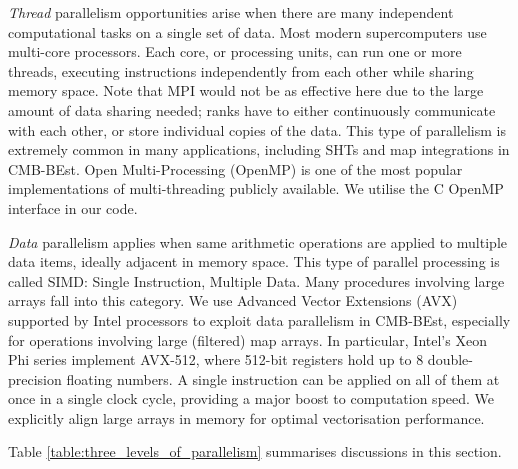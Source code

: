 \textit{Thread} parallelism opportunities arise when there are many independent computational tasks on a single set of data. Most modern supercomputers use multi-core processors. Each core, or processing units, can run one or more threads, executing instructions independently from each other while sharing memory space. Note that MPI would not be as effective here due to the large amount of data sharing needed; ranks have to either continuously communicate with each other, or store individual copies of the data. This type of parallelism is extremely common in many applications, including SHTs and map integrations in CMB-BEst. Open Multi-Processing (OpenMP) is one of the most popular implementations of multi-threading publicly available. We utilise the \textsc{C} OpenMP interface in our code. 

\textit{Data} parallelism applies when same arithmetic operations are applied to multiple data items, ideally adjacent in memory space. This type of parallel processing is called SIMD: Single Instruction, Multiple Data. Many procedures involving large arrays fall into this category. We use Advanced Vector Extensions (AVX) supported by Intel processors to exploit data parallelism in CMB-BEst, especially for operations involving large (filtered) map arrays. In particular, Intel's Xeon Phi series implement AVX-512, where 512-bit registers hold up to 8 double-precision floating numbers. A single instruction can be applied on all of them at once in a single clock cycle, providing a major boost to computation speed. We explicitly align large arrays in memory for optimal vectorisation performance.

Table \ref{table:three_levels_of_parallelism} summarises discussions in this section.

